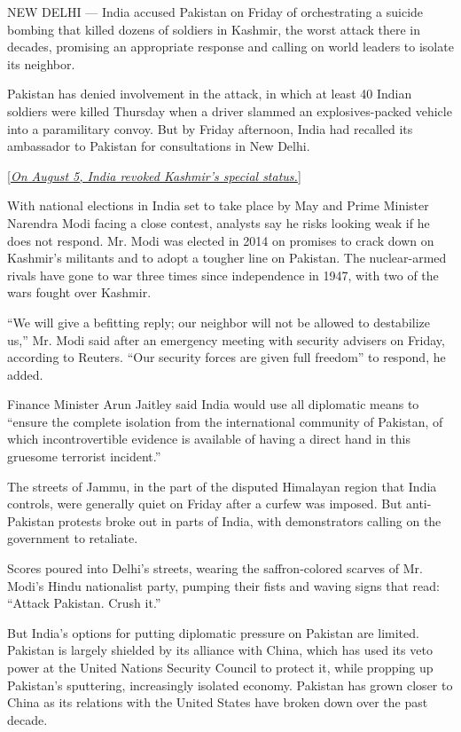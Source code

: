 NEW DELHI --- India accused Pakistan on Friday of orchestrating a
suicide bombing that killed dozens of soldiers in Kashmir, the worst
attack there in decades, promising an appropriate response and calling
on world leaders to isolate its neighbor.

Pakistan has denied involvement in the attack, in which at least 40
Indian soldiers were killed Thursday when a driver slammed an
explosives-packed vehicle into a paramilitary convoy. But by Friday
afternoon, India had recalled its ambassador to Pakistan for
consultations in New Delhi.

{[}\emph{\href{https://www.nytimes.com/2019/08/05/world/asia/india-pakistan-kashmir-jammu.html}{On
August 5, India revoked Kashmir's special status.}}{]}

With national elections in India set to take place by May and Prime
Minister Narendra Modi facing a close contest, analysts say he risks
looking weak if he does not respond. Mr. Modi was elected in 2014 on
promises to crack down on Kashmir's militants and to adopt a tougher
line on Pakistan. The nuclear-armed rivals have gone to war three times
since independence in 1947, with two of the wars fought over Kashmir.

``We will give a befitting reply; our neighbor will not be allowed to
destabilize us,'' Mr. Modi said after an emergency meeting with security
advisers on Friday, according to Reuters. ``Our security forces are
given full freedom'' to respond, he added.

Finance Minister Arun Jaitley said India would use all diplomatic means
to ``ensure the complete isolation from the international community of
Pakistan, of which incontrovertible evidence is available of having a
direct hand in this gruesome terrorist incident.''

The streets of Jammu, in the part of the disputed Himalayan region that
India controls, were generally quiet on Friday after a curfew was
imposed. But anti-Pakistan protests broke out in parts of India, with
demonstrators calling on the government to retaliate.

Scores poured into Delhi's streets, wearing the saffron-colored scarves
of Mr. Modi's Hindu nationalist party, pumping their fists and waving
signs that read: ``Attack Pakistan. Crush it.''

But India's options for putting diplomatic pressure on Pakistan are
limited. Pakistan is largely shielded by its alliance with China, which
has used its veto power at the United Nations Security Council to
protect it, while propping up Pakistan's sputtering, increasingly
isolated economy. Pakistan has grown closer to China as its relations
with the United States have broken down over the past decade.

